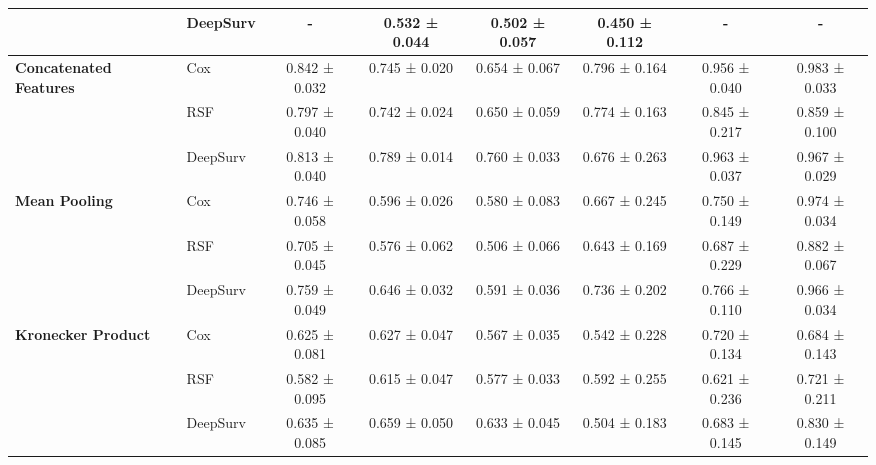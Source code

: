 \begin{sidewaystable}[htbp]
\begin{tabular}{@{}llcccccc@{}}
        & DeepSurv & - & 0.532 ± 0.044 & 0.502 ± 0.057 & 0.450 ± 0.112 & - & - \\
        \midrule
        \multirow{3}{*}{\textbf{Concatenated Features}} & Cox & 0.842 ± 0.032 & 0.745 ± 0.020 & 0.654 ± 0.067 & 0.796 ± 0.164 & 0.956 ± 0.040 & 0.983 ± 0.033 \\
        & RSF & 0.797 ± 0.040 & 0.742 ± 0.024 & 0.650 ± 0.059 & 0.774 ± 0.163 & 0.845 ± 0.217 & 0.859 ± 0.100 \\
        & DeepSurv & 0.813 ± 0.040 & 0.789 ± 0.014 & 0.760 ± 0.033 & 0.676 ± 0.263 & 0.963 ± 0.037 & 0.967 ± 0.029 \\
        \midrule
        \multirow{3}{*}{\textbf{Mean Pooling}} & Cox & 0.746 ± 0.058 & 0.596 ± 0.026 & 0.580 ± 0.083 & 0.667 ± 0.245 & 0.750 ± 0.149 & 0.974 ± 0.034 \\
        & RSF & 0.705 ± 0.045 & 0.576 ± 0.062 & 0.506 ± 0.066 & 0.643 ± 0.169 & 0.687 ± 0.229 & 0.882 ± 0.067 \\
        & DeepSurv & 0.759 ± 0.049 & 0.646 ± 0.032 & 0.591 ± 0.036 & 0.736 ± 0.202 & 0.766 ± 0.110 & 0.966 ± 0.034 \\
        \midrule
        \multirow{3}{*}{\textbf{Kronecker Product}} & Cox & 0.625 ± 0.081 & 0.627 ± 0.047 & 0.567 ± 0.035 & 0.542 ± 0.228 & 0.720 ± 0.134 & 0.684 ± 0.143 \\
        & RSF & 0.582 ± 0.095 & 0.615 ± 0.047 & 0.577 ± 0.033 & 0.592 ± 0.255 & 0.621 ± 0.236 & 0.721 ± 0.211 \\
        & DeepSurv & 0.635 ± 0.085 & 0.659 ± 0.050 & 0.633 ± 0.045 & 0.504 ± 0.183 & 0.683 ± 0.145 & 0.830 ± 0.149 \\
        \bottomrule
    \end{tabular}
\end{sidewaystable}